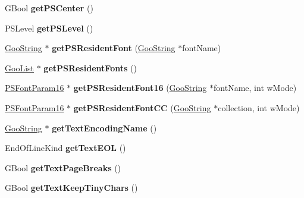 \begin{DoxyCompactItemize}
G\+Bool {\bfseries get\+P\+S\+Center} ()
\item 
\mbox{\label{class_global_params_a0446746aa55f7fb73d905a0a973cf25f}} 
P\+S\+Level {\bfseries get\+P\+S\+Level} ()
\item 
\mbox{\label{class_global_params_a449e4bda2c886e8c1ecee623379abace}} 
\hyperlink{class_goo_string}{Goo\+String} $\ast$ {\bfseries get\+P\+S\+Resident\+Font} (\hyperlink{class_goo_string}{Goo\+String} $\ast$font\+Name)
\item 
\mbox{\label{class_global_params_a31b11b505fb1cc2693f934db3f18e735}} 
\hyperlink{class_goo_list}{Goo\+List} $\ast$ {\bfseries get\+P\+S\+Resident\+Fonts} ()
\item 
\mbox{\label{class_global_params_ab731b325feac94ddffabda45f6b22495}} 
\hyperlink{class_p_s_font_param16}{P\+S\+Font\+Param16} $\ast$ {\bfseries get\+P\+S\+Resident\+Font16} (\hyperlink{class_goo_string}{Goo\+String} $\ast$font\+Name, int w\+Mode)
\item 
\mbox{\label{class_global_params_ab8dc213b52ac5cdd9d2001a78b27bd8a}} 
\hyperlink{class_p_s_font_param16}{P\+S\+Font\+Param16} $\ast$ {\bfseries get\+P\+S\+Resident\+Font\+CC} (\hyperlink{class_goo_string}{Goo\+String} $\ast$collection, int w\+Mode)
\item 
\mbox{\label{class_global_params_a829ac7d8ae42db6067608c190e494e5e}} 
\hyperlink{class_goo_string}{Goo\+String} $\ast$ {\bfseries get\+Text\+Encoding\+Name} ()
\item 
\mbox{\label{class_global_params_af2dbdbe041624eb04f4e35c94d2b4219}} 
End\+Of\+Line\+Kind {\bfseries get\+Text\+E\+OL} ()
\item 
\mbox{\label{class_global_params_a424e762af6d702b3c6566288d5e0a94d}} 
G\+Bool {\bfseries get\+Text\+Page\+Breaks} ()
\item 
\mbox{\label{class_global_params_a799750fb5bcd340ac7477503f003ff2f}} 
G\+Bool {\bfseries get\+Text\+Keep\+Tiny\+Chars} ()
\item 

\end{DoxyCompactItemize}
